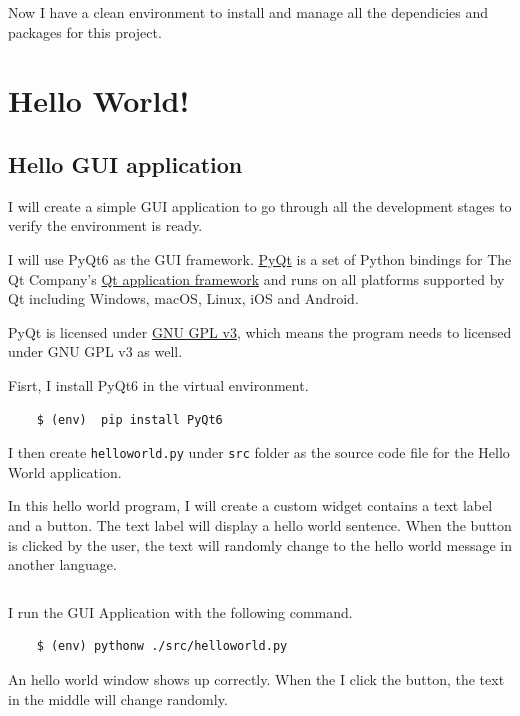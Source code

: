 \documentclass{report}
\begin{document}
Now I have a clean environment to install and manage all the dependicies and packages for this project.

\section{Hello World!}

\subsection{Hello GUI application}

I will create a simple GUI application to go through all the development stages to verify the environment is ready.

I will use PyQt6 as the GUI framework. \href{https://riverbankcomputing.com/software/pyqt}{PyQt} is a set of Python bindings for The Qt Company's \href{https://www.qt.io/}{Qt application framework} and runs on all platforms supported by Qt including Windows, macOS, Linux, iOS and Android.

PyQt is licensed under \href{https://www.gnu.org/licenses/gpl-3.0.en.html}{GNU GPL v3}, which means the program needs to licensed under GNU GPL v3 as well.

Fisrt, I install PyQt6 in the virtual environment.

\begin{verbatim}
    $ (env)  pip install PyQt6
\end{verbatim}

I then create \texttt{helloworld.py} under \texttt{src} folder as the source code file for the Hello World application.

In this hello world program, I will create a custom widget contains a text label and a button. The text label will display a hello world sentence. When the button is clicked by the user, the text will randomly change to the hello world message in another language.

\inputminted{python}{../src/helloworld.py}

I run the GUI Application with the following command.

\begin{verbatim}
    $ (env) pythonw ./src/helloworld.py
\end{verbatim}

An hello world window shows up correctly. When the I click the  button, the text in the middle will change randomly.
\end{document}
